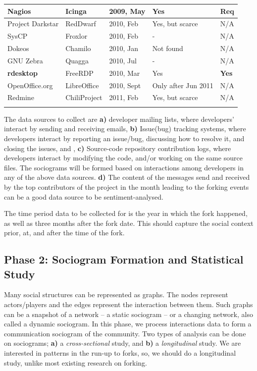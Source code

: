 \documentclass{acm_proc_article-sp}
\begin{document}
\begin{table} [!Ht]
\begin{tabular}{m{} m{} m{} m{} m{}}
Nagios & Icinga & 2009, May & Yes & Req \\ \hline
Project Darkstar& RedDwarf & 2010, Feb & Yes, but scarce & N/A \\ \hline
SysCP & Froxlor & 2010, Feb & - & N/A \\ \hline
Dokeos & Chamilo & 2010, Jan & Not found & N/A \\ \hline
GNU Zebra & Quagga & 2010, Jul & - & N/A \\ \hline
\textbf{rdesktop} & FreeRDP & 2010, Mar & Yes & \textbf{Yes} \\ \hline
OpenOffice.org & LibreOffice & 2010, Sept & Only after Jun 2011 & N/A \\ \hline
Redmine & ChiliProject & 2011, Feb & Yes, but scarce & N/A \\
\noalign{\smallskip}\hline
\end{tabular}
\end{table}


The data sources to collect are \textbf{a)} developer mailing lists, where developers' interact by sending and receiving emails, \textbf{b)} Issue(bug) tracking systems, where developers interact by reporting an issue/bug, discussing how to resolve it, and closing the issues, and , \textbf{c)} Source-code repository contribution logs, where developers interact by modifying the code, and/or working on the same source files. The sociograms will be formed based on interactions among developers in any of the above data sources. \textbf{d)} The content of the messages send and received by the top contributors of the project in the month leading to the forking events can be a good data source to be sentiment-analysed.

The time period data to be collected for is the year in which the fork happened, as well as three months after the fork date. This should capture the social context prior, at, and after the time of the fork.

\subsection{Phase 2: Sociogram Formation and Statistical Study}

Many social structures can be represented as graphs. The nodes represent actors/players and the edges represent the interaction between them. Such graphs can be a snapshot of a network -- a static sociogram -- or a changing network, also called a dynamic sociogram. In this phase, we process interactions data to form a communication sociogram of the community. Two types of analysis can be done on sociograms; \textbf{a)} a \textit{cross-sectional} study, and \textbf{b)} a \textit{longitudinal} study. We are interested in patterns in the run-up to forks, so, we should do a longitudinal study, unlike most existing research on forking.
\end{document}
